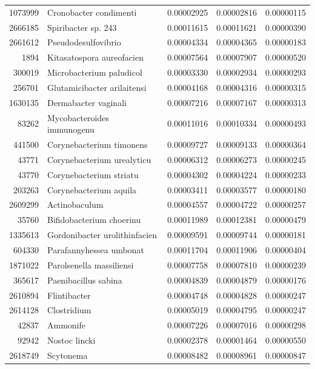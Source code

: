 \documentclass{article}
\begin{document}
\begin{table}[ht]
\begin{tabular}{rlrrr}
  1073999 & Cronobacter condimenti & 0.00002925 & 0.00002816 & 0.00000115 \\ 
  2666185 & Spiribacter sp. 243 & 0.00011615 & 0.00011621 & 0.00000390 \\ 
  2661612 & Pseudodesulfovibrio & 0.00004334 & 0.00004365 & 0.00000183 \\ 
  1894 & Kitasatospora aureofacien & 0.00007564 & 0.00007907 & 0.00000520 \\ 
  300019 & Microbacterium paludicol & 0.00003330 & 0.00002934 & 0.00000293 \\ 
  256701 & Glutamicibacter arilaitensi & 0.00004168 & 0.00004316 & 0.00000315 \\ 
  1630135 & Dermabacter vaginali & 0.00007216 & 0.00007167 & 0.00000313 \\ 
  83262 & Mycobacteroides immunogenu & 0.00011016 & 0.00010334 & 0.00000493 \\ 
  441500 & Corynebacterium timonens & 0.00009727 & 0.00009133 & 0.00000364 \\ 
  43771 & Corynebacterium urealyticu & 0.00006312 & 0.00006273 & 0.00000245 \\ 
  43770 & Corynebacterium striatu & 0.00004302 & 0.00004224 & 0.00000233 \\ 
  203263 & Corynebacterium aquila & 0.00003411 & 0.00003577 & 0.00000180 \\ 
  2609299 & Actinobaculum & 0.00004557 & 0.00004722 & 0.00000257 \\ 
  35760 & Bifidobacterium choerinu & 0.00011989 & 0.00012381 & 0.00000479 \\ 
  1335613 & Gordonibacter urolithinfacien & 0.00009591 & 0.00009744 & 0.00000181 \\ 
  604330 & Parafannyhessea umbonat & 0.00011704 & 0.00011906 & 0.00000404 \\ 
  1871022 & Parolsenella massiliensi & 0.00007758 & 0.00007810 & 0.00000239 \\ 
  365617 & Paenibacillus sabina & 0.00004839 & 0.00004879 & 0.00000176 \\ 
  2610894 & Flintibacter & 0.00004748 & 0.00004828 & 0.00000247 \\ 
  2614128 & Clostridium & 0.00005019 & 0.00004795 & 0.00000247 \\ 
  42837 &  Ammonife & 0.00007226 & 0.00007016 & 0.00000298 \\ 
  92942 & Nostoc lincki & 0.00002378 & 0.00001464 & 0.00000550 \\ 
  2618749 & Scytonema & 0.00008482 & 0.00008961 & 0.00000847 \\ 

\end{tabular}
\end{table}
\end{document}
